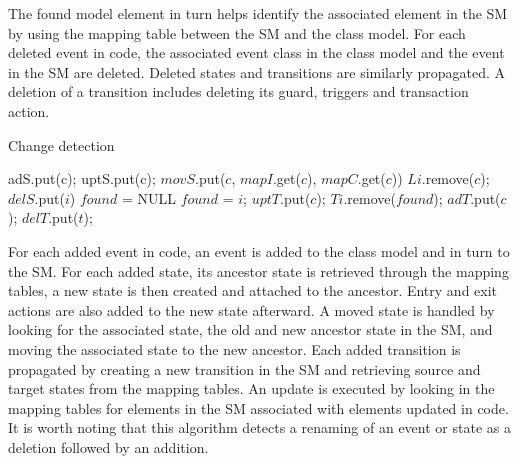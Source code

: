 The found model element in turn helps identify the associated element in the SM by using the mapping table between the SM and the class model. For each deleted event in code, the associated event class in the class model and the event in the SM are deleted. Deleted states and transitions are similarly propagated. A deletion of a transition includes deleting its guard, triggers and transaction action. 
\begin{algorithm}[H]
  \caption{Change detection
    \label{alg:change-detect}}
  \begin{algorithmic}[1]
				\State adS.put(c);
        	\Else
	    			\State uptS.put(c);
				\Else 
	    			\State $movS$.put($c$, $mapI$.get($c$), $mapC$.get($c$))	
                \EndIf
                	\State $Li$.remove($c$);
        	\EndIf
    	\EndFor
        	\State $delS$.put($i$)
    	\EndFor
        	\State $found$ = NULL
	    			\State $found$ = $i$;
              	\EndIf
             \EndFor 	
				\State $uptT$.put($c$);
				\State $Ti$.remove($found$);
        	\Else
				\State $adT$.put($c$);
        	\EndIf
    	\EndFor
        	\State $delT$.put($t$);
    	\EndFor
  \end{algorithmic}
\end{algorithm} 
For each added event in code, an event is added to the class model and in turn to the SM. For each added state, its ancestor state is retrieved through the mapping tables, a new state is then created and attached to the ancestor. Entry and exit actions are also added to the new state afterward. A moved state is handled by looking for the associated state, the old and new ancestor state in the SM, and moving the associated state to the new ancestor. Each added transition is propagated by creating a new transition in the SM and retrieving source and target states from the mapping tables. An update is executed by looking in the mapping tables for elements in the SM associated with elements updated in code. It is worth noting that this algorithm detects a renaming of an event or state as a deletion followed by an addition. 


